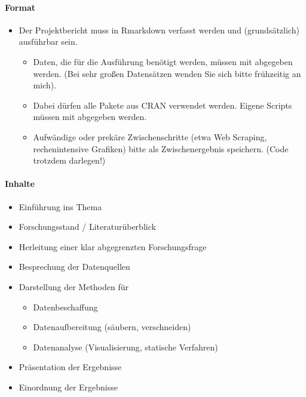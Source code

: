 \documentclass[
  ngerman,
]{article}
\providecommand{\tightlist}{%
  \setlength{\itemsep}{0pt}\setlength{\parskip}{0pt}}
\begin{document}
\hypertarget{format}{%
\paragraph{Format}\label{format}}

\begin{itemize}
\tightlist
\item
  Der Projektbericht muss in Rmarkdown verfasst werden und (grundsätzlich) ausführbar sein.

  \begin{itemize}
  \tightlist
  \item
    Daten, die für die Ausführung benötigt werden, müssen mit abgegeben werden. (Bei sehr großen Datensätzen wenden Sie sich bitte frühzeitig an mich).
  \item
    Dabei dürfen alle Pakete aus CRAN verwendet werden. Eigene Scripts müssen mit abgegeben werden.
  \item
    Aufwändige oder prekäre Zwischenschritte (etwa Web Scraping, rechenintensive Grafiken) bitte als Zwischenergebnis speichern. (Code trotzdem darlegen!)
  \end{itemize}
\end{itemize}

\hypertarget{inhalte-1}{%
\paragraph{Inhalte}\label{inhalte-1}}

\begin{itemize}
\tightlist
\item
  Einführung ins Thema
\item
  Forschungsstand / Literaturüberblick
\item
  Herleitung einer klar abgegrenzten Forschungsfrage
\item
  Besprechung der Datenquellen
\item
  Darstellung der Methoden für

  \begin{itemize}
  \tightlist
  \item
    Datenbeschaffung
  \item
    Datenaufbereitung (säubern, verschneiden)
  \item
    Datenanalyse (Visualisierung, statische Verfahren)
  \end{itemize}
\item
  Präsentation der Ergebnisse
\item
  Einordnung der Ergebnisse
\end{itemize}
\end{document}
